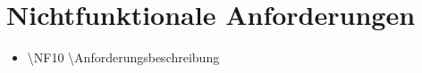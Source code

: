 \section{Nichtfunktionale Anforderungen}

\begin{itemize}
\item \textbackslash NF10 \textbackslash Anforderungsbeschreibung
\end{itemize}